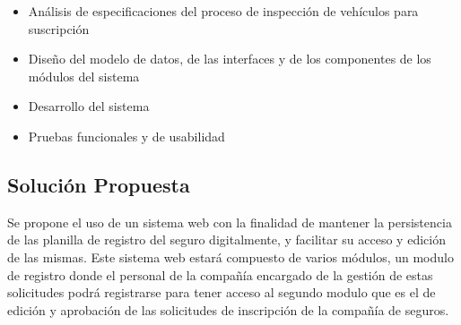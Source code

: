 \begin{itemize}

	
	





   \item Análisis de especificaciones del proceso de inspección de vehículos para suscripción

   \item Diseño del modelo de datos, de las interfaces y de los componentes de los módulos del sistema

   \item Desarrollo del sistema

   \item Pruebas funcionales y de usabilidad
	
	

\end{itemize}



\subsection{Solución Propuesta}
\setlength{\parskip}{5mm}
Se propone el uso de un sistema web con la finalidad de mantener la persistencia de las planilla de registro del seguro digitalmente, y facilitar su acceso y edición de las mismas. Este sistema web estará compuesto de varios módulos, un modulo de registro donde el personal de la compañía encargado de la gestión de estas solicitudes podrá registrarse para tener acceso al segundo modulo que es el de edición y aprobación de las solicitudes de inscripción de la compañía de seguros.



